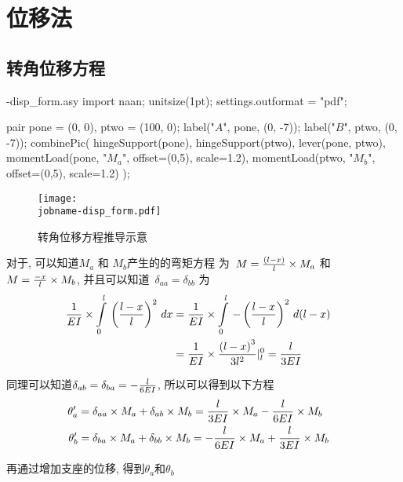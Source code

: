 \chapter{位移法}

\section{转角位移方程}

\begin{filecontents*}{\jobname-disp_form.asy}
import naan;
unitsize(1pt);
settings.outformat = "pdf";

pair pone = (0, 0), ptwo = (100, 0);
label("$A$", pone, (0, -7));
label("$B$", ptwo, (0, -7));
combinePic(
        hingeSupport(pone),
        hingeSupport(ptwo),
        lever(pone, ptwo),
        momentLoad(pone, "$M_a$", offset=(0,5), scale=1.2),
        momentLoad(ptwo, "$M_b$", offset=(0,5), scale=1.2)
);
\end{filecontents*}

\begin{figure}[H]
\begin{center}
\texttt{[image: \\jobname-disp\_form.pdf]}
\caption{转角位移方程推导示意}
\label{fig:disp_form}
\end{center}
\end{figure}

对于, 可以知道$M_a$ 和 $M_b$产生的的弯矩方程
为\ $M = {(l-x)\over l}\times M_a$ 和 $M = {-x\over l}\times M_b$,
并且可以知道\ $\delta_{aa} = \delta_{bb}$ 为
\begin{align*}
{1\over EI}\times\int\limits_{0}^{l}\,\left(l-x\over l\right)^2\,dx &= 
{1\over EI}\times\int\limits_{0}^{l}\,-\left(l-x\over l\right)^2\,d(l-x)\cr &= 
{1\over EI}\times{\left(l-x\right)^3\over 3l^2}|^0_l = {l\over 3EI}
\end{align*}

同理可以知道$\delta_{ab} = \delta_{ba} = -{l\over 6EI}$, 所以可以得到以下方程
\begin{align}
\theta_a^\prime &= \delta_{aa}\times M_a + \delta_{ab}\times M_b = {l\over 3EI}\times M_a - {l\over 6EI}\times M_b\cr
\theta_b^\prime &= \delta_{ba}\times M_a + \delta_{bb}\times M_b = -{l\over 6EI}\times M_a + {l\over 3EI}\times M_b
\end{align}

再通过增加支座的位移, 得到$\theta_a$和$\theta_b$

